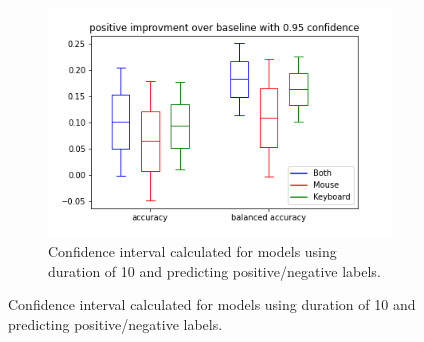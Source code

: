 \begin{figure}[!h]
\begin{subfigure}[b]{0.31\textwidth}
        \centering
        \includegraphics[width=\textwidth]{figures/results/interval_difference/10/10_positive_0.95.png}
        \captionsetup{justification=centering}
        \caption{Confidence interval calculated for models using duration of 10 and predicting positive/negative labels.}
    \end{subfigure}



\end{figure}
